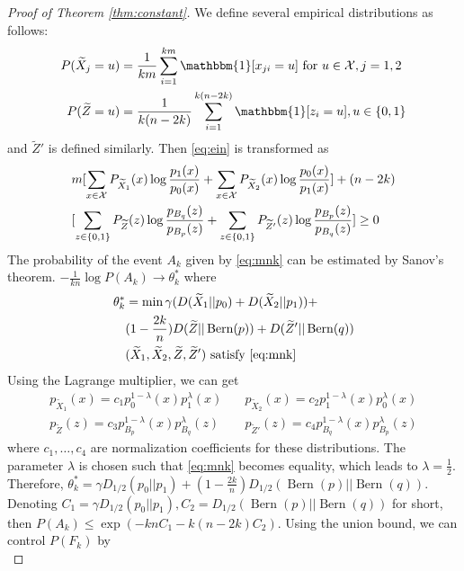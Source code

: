 \documentclass[conference]{IEEEtran}
\DeclareMathOperator{\Bern}{Bern}
\begin{document}
\begin{proof}[Proof of Theorem \ref{thm:constant}]
We define several empirical distributions as follows: 
\begin{align*}
P(\widetilde{X}_j = u) &= \frac{1}{km} \sum_{i=1}^{km} \mathbbm{1}[x_{ji} = u] \textrm{ for } u \in \mathcal{X}, j=1,2 \\
P(\widetilde{Z} = u) &= \frac{1}{k(n-2k)}\sum_{i=1}^{k(n-2k)} \mathbbm{1}[z_i = u], u \in \{0, 1\}
\end{align*}
and $\widetilde{Z}'$ is defined similarly. Then
\eqref{eq:ein} is transformed as
\begin{align}
&m[\sum_{x\in \mathcal{X}}P_{\widetilde{X}_1}(x)\log\frac{p_1(x)}{p_0(x)}
+\sum_{x\in \mathcal{X}}P_{\widetilde{X}_2}(x)\log\frac{p_0(x)}{p_1(x)}] +(n-2k)\notag \\
&[\sum_{z\in\{0,1\}} P_{\widetilde{Z}}(z) \log \frac{p_{B_q}(z)}{p_{B_p}(z)}
+ \sum_{z\in\{0,1\}} P_{\widetilde{Z}'}(z) \log \frac{p_{B_p}(z)}{p_{B_q}(z)}] \geq 0 \label{eq:mnk}
\end{align}
The probability of the event $A_k$ given by \eqref{eq:mnk} can be estimated by Sanov's theorem.
$-\frac{1}{kn}\log P(A_k) \to \theta^*_k$ where 
\begin{align*}
\theta^*_k &= \min \gamma (D(\widetilde{X}_1||p_0) + D(\widetilde{X}_2||p_1)) + \\
&(1-\frac{2k}{n})D(\widetilde{Z}||\Bern(p)) + D(\widetilde{Z}'||\Bern(q))  \\
& (\widetilde{X}_1, \widetilde{X}_2, \widetilde{Z}, \widetilde{Z}')
\textrm{ satisfy } \eqref{eq:mnk}
\end{align*}
Using the Lagrange multiplier, we can get
\begin{align*}
p_{\widetilde{X}_1}(x) = c_1 p_0^{1-\lambda}(x)p_1^{\lambda}(x)\quad & p_{\widetilde{X}_2}(x) = c_2 p_1^{1-\lambda}(x)p_0^{\lambda}(x) \\
p_{\widetilde{Z}}(z) = c_3 p_{B_p}^{1-\lambda}(x)p_{B_q}^{\lambda}(z)\quad &
p_{\widetilde{Z}'}(z) = c_4 p_{B_q}^{1-\lambda}(x)p_{B_p}^{\lambda}(z)
\end{align*}
where $c_1, \dots, c_4$ are normalization coefficients for these distributions.
The parameter $\lambda$ is chosen such that \eqref{eq:mnk} becomes equality, which leads to $\lambda=\frac{1}{2}$.
Therefore, $\theta^*_k = \gamma D_{1/2}(p_0 || p_1) +(1-\frac{2k}{n}) D_{1/2}(\Bern(p)||\Bern(q))$.
Denoting $C_1=\gamma D_{1/2}(p_0 || p_1), C_2=D_{1/2}(\Bern(p)||\Bern(q))$ for short,
then $
P(A_k) \leq \exp(-knC_1-k(n-2k) C_2)
$. Using the union bound, we can control $P(F_k)$ by
\begin{equation}\label{eq:FAk}

\end{equation}
\end{proof}
\end{document}
